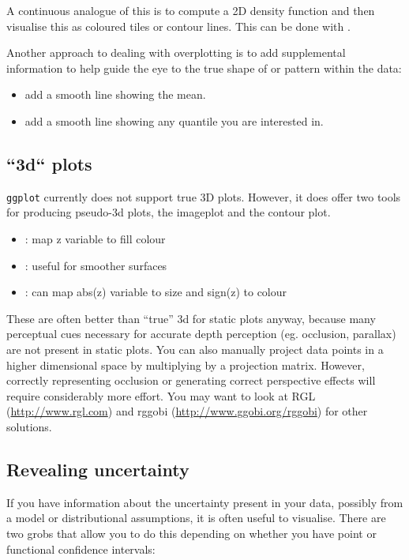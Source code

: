 A continuous analogue of this is to compute a 2D density function and then visualise this as coloured tiles or contour lines.  This can be done with .

Another approach to dealing with overplotting is to add supplemental information to help guide the eye to the true shape of or pattern within the data:

\begin{itemize}
	\item {} add a smooth line showing the mean.
	\item {} add a smooth line showing any quantile you are interested in.
\end{itemize}

\subsection{``3d`` plots}\label{sub:_3d_plots}

{\tt ggplot} currently does not support true 3D plots.  However, it does offer two tools for producing pseudo-3d plots, the imageplot and the contour plot.

\begin{itemize}
	\item {}: map z variable to fill colour
	\item {}: useful for smoother surfaces
	\item {}: can map abs(z) variable to size and sign(z) to colour
\end{itemize}

These are often better than ``true'' 3d for static plots anyway, because many perceptual cues necessary for accurate depth perception (eg. occlusion, parallax) are not present in static plots.  You can also manually project data points in a higher dimensional space by multiplying by a projection matrix.  However, correctly representing occlusion or generating correct perspective effects will require considerably more effort.  You may want to look at RGL (\url{http://www.rgl.com}) and rggobi (\url{http://www.ggobi.org/rggobi}) for other solutions.

\subsection{Revealing uncertainty}\label{sub:displaying_uncertainty}

If you have information about the uncertainty present in your data, possibly from a model or distributional assumptions, it is often useful to visualise.  There are two grobs that allow you to do this depending on whether you have point or functional confidence intervals:

